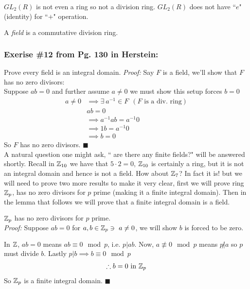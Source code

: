 \begin{example}
    $GL_2(R)$ is not even a ring so not a division ring. $GL_2(R)$ does not have ``$e$" (identity) for ``$+$" operation.
\end{example}

\begin{definition}[Field] 
A \textit{field} is a commutative division ring.
\end{definition}

\subsubsection*{Exerise \#12 from Pg. 130 in Herstein:}
Prove every field is an integral domain.
\textit{Proof:} Say $F$ is a field, we'll show that $F$ has no zero divisors: \steezybreak\\
Suppose $ab=0$ and further assume $a\neq 0$ we must show this setup forces $b=0$
\begin{align}
    a\neq 0 &\implies \exists \ a^{-1}\in F \ \ (F\text{ is a div. ring}) \nonumber \\
    &ab=0 \nonumber \\
    &\implies a^{-1}ab =a^{-1}0 \nonumber \\
    &\implies 1b = a^{-1}0 \nonumber \\
    &\implies b=0 \nonumber
\end{align}
So $F$ has no zero divisors. $\blacksquare$ \steezybreak\\

A natural question one might ask, `` are there any finite fields?" will be answered shortly. Recall in ${\mathbb{ Z}}_{10}$ we have that $5\cdot 2 = 0$, ${\mathbb{ Z}}_{10}$ is certainly a ring, but it is not an integral domain and hence is not a field. How about ${\mathbb{ Z}}_{7}$? In fact it is! but we will need to prove two more results to make it very clear, first we will prove ring ${\mathbb{ Z}}_p$, has no zero divisors for $p$ prime (making it a finite integral domain). Then in the lemma that follows we will prove that a finite integral domain is a field.

\begin{proposition} 
${\mathbb{ Z}}_p$ has no zero divisors for $p$ prime. \steezybreak\\
\textit{Proof:} Suppose $ab=0$ for $a,b \in {\mathbb{ Z}}_p \ni \ a\neq 0$, we will show $b$ is forced to be zero. 

\noindent In ${\mathbb{ Z}}$, $ab=0$ means $ab\equiv 0 \mod p$, i.e. $p|ab$. Now, $a\not\equiv 0 \mod p$ means $p\not | a$ so $p$ must divide $b$. Lastly $p|b \implies b\equiv 0 \mod p$
\begin{align}
    \therefore b=0 \text{ in } {\mathbb{ Z}}_p \nonumber
\end{align}
So ${\mathbb{ Z}}_p$ is a finite integral domain. $\blacksquare$
\end{proposition}


